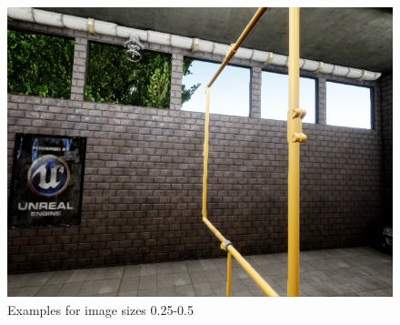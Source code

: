 \documentclass{article}
\begin{document}
\begin{figure}[htbp]
\begin{minipage}{0.3\linewidth}
	\includegraphics[width=\linewidth]{size_examples/025-05 (7).jpg}
\end{minipage}
	\caption{Examples for image sizes 0.25-0.5}
\end{figure}
\end{document}
